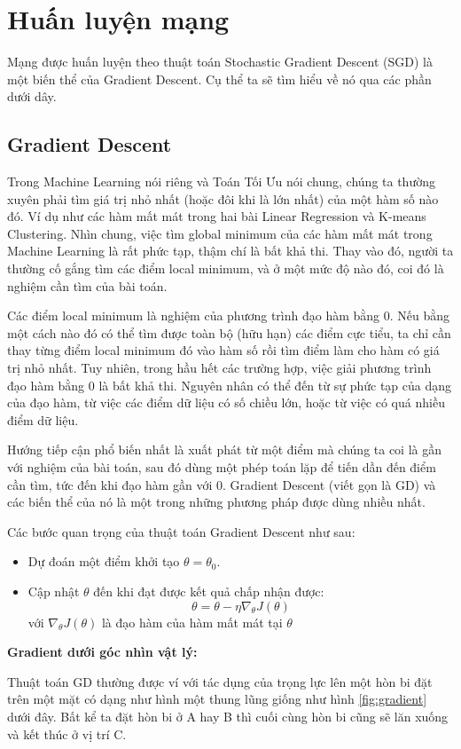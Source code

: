 \section{Huấn luyện mạng}
Mạng được huấn luyện theo thuật toán Stochastic Gradient Descent (SGD) là một biến thể của Gradient Descent. Cụ thể ta sẽ tìm hiểu về nó qua các phần dưới dây.

\subsection{Gradient Descent}
Trong Machine Learning nói riêng và Toán Tối Ưu nói chung, chúng ta thường xuyên phải tìm giá trị nhỏ nhất (hoặc đôi khi là lớn nhất) của một hàm số nào đó. Ví dụ như các hàm mất mát trong hai bài Linear Regression và K-means Clustering. Nhìn chung, việc tìm global minimum của các hàm mất mát trong Machine Learning là rất phức tạp, thậm chí là bất khả thi. Thay vào đó, người ta thường cố gắng tìm các điểm local minimum, và ở một mức độ nào đó, coi đó là nghiệm cần tìm của bài toán.

Các điểm local minimum là nghiệm của phương trình đạo hàm bằng 0. Nếu bằng một cách nào đó có thể tìm được toàn bộ (hữu hạn) các điểm cực tiểu, ta chỉ cần thay từng điểm local minimum đó vào hàm số rồi tìm điểm làm cho hàm có giá trị nhỏ nhất. Tuy nhiên, trong hầu hết các trường hợp, việc giải phương trình đạo hàm bằng 0 là bất khả thi. Nguyên nhân có thể đến từ sự phức tạp của dạng của đạo hàm, từ việc các điểm dữ liệu có số chiều lớn, hoặc từ việc có quá nhiều điểm dữ liệu.

Hướng tiếp cận phổ biến nhất là xuất phát từ một điểm mà chúng ta coi là gần với nghiệm của bài toán, sau đó dùng một phép toán lặp để tiến dần đến điểm cần tìm, tức đến khi đạo hàm gần với 0. Gradient Descent (viết gọn là GD) và các biến thể của nó là một trong những phương pháp được dùng nhiều nhất.

Các bước quan trọng của thuật toán Gradient Descent như sau:
\begin{itemize}
\item Dự đoán một điểm khởi tạo $\theta = \theta_0$.
\item Cập nhật $\theta$ đến khi đạt được kết quả chấp nhận được: 
$$\theta = \theta - \eta \nabla_{\theta}J(\theta)$$
với $\nabla_{\theta}J(\theta)$ là đạo hàm của hàm mất mát tại $\theta$
\end{itemize}

\textbf{Gradient dưới góc nhìn vật lý:}

Thuật toán GD thường được ví với tác dụng của trọng lực lên một hòn bi đặt trên một mặt có dạng như hình một thung lũng giống như hình \ref{fig:gradient} dưới đây. Bất kể ta đặt hòn bi ở A hay B thì cuối cùng hòn bi cũng sẽ lăn xuống và kết thúc ở vị trí C.

